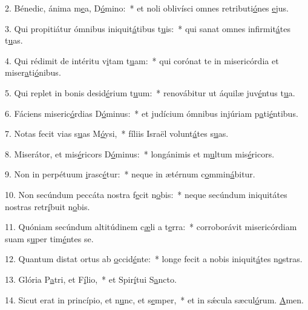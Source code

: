 2. Bénedic, ánima m\uline{e}a, D\uline{ó}mino:~* et noli oblivísci omnes retributi\uline{ó}nes \uline{e}jus.\par 
3. Qui propitiátur ómnibus iniquit\uline{á}tibus t\uline{u}is:~* qui sanat omnes infirmit\uline{á}tes t\uline{u}as.\par 
4. Qui rédimit de intéritu v\uline{i}tam t\uline{u}am:~* qui corónat te in misericórdia et miser\uline{a}ti\uline{ó}nibus.\par 
5. Qui replet in bonis desid\uline{é}rium t\uline{u}um:~* renovábitur ut áquilæ juv\uline{é}ntus t\uline{u}a.\par 
6. Fáciens miseric\uline{ó}rdias D\uline{ó}minus:~* et judícium ómnibus injúriam p\uline{a}ti\uline{é}ntibus.\par 
7. Notas fecit vias s\uline{u}as M\uline{ó}ysi,~* fíliis Israël volunt\uline{á}tes s\uline{u}as.\par 
8. Miserátor, et mis\uline{é}ricors D\uline{ó}minus:~* longánimis et m\uline{u}ltum mis\uline{é}ricors.\par 
9. Non in perpétuum \uline{i}rasc\uline{é}tur:~* neque in ætérnum c\uline{o}mmin\uline{á}bitur.\par 
10. Non secúndum peccáta nostra f\uline{e}cit n\uline{o}bis:~* neque secúndum iniquitátes nostras retr\uline{í}buit n\uline{o}bis.\par 
11. Quóniam secúndum altitúdinem c\uline{æ}li a t\uline{e}rra:~* corroborávit misericórdiam suam s\uline{u}per tim\uline{é}ntes se.\par 
12. Quantum distat ortus ab \uline{o}ccid\uline{é}nte:~* longe fecit a nobis iniquit\uline{á}tes n\uline{o}stras.\par 
13. Glória P\uline{a}tri, et F\uline{í}lio,~* et Spir\uline{í}tui S\uline{a}ncto.\par 
14. Sicut erat in princípio, et n\uline{u}nc, et s\uline{e}mper,~* et in sǽcula sæcul\uline{ó}rum. \uline{A}men.\par 
